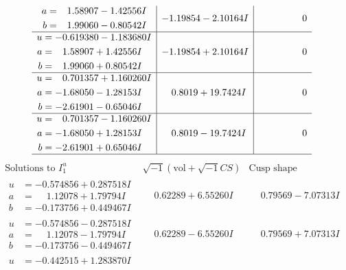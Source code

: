 \documentclass[1p]{elsarticle_modified}
\theoremstyle{definition}
\newcommand{\I}{\sqrt{-1}}
\begin{document}
$$\begin{array}{c|c|c}
\begin{aligned}
a &= \phantom{-}1.58907 - 1.42556 I \\
b &= \phantom{-}1.99060 - 0.80542 I\end{aligned}
 & -1.19854 - 2.10164 I & \phantom{-0.000000 } 0 \\ \hline\begin{aligned}
u &= -0.619380 - 1.183680 I \\
a &= \phantom{-}1.58907 + 1.42556 I \\
b &= \phantom{-}1.99060 + 0.80542 I\end{aligned}
 & -1.19854 + 2.10164 I & \phantom{-0.000000 } 0 \\ \hline\begin{aligned}
u &= \phantom{-}0.701357 + 1.160260 I \\
a &= -1.68050 - 1.28153 I \\
b &= -2.61901 - 0.65046 I\end{aligned}
 & \phantom{-}0.8019 + 19.7424 I & \phantom{-0.000000 } 0 \\ \hline\begin{aligned}
u &= \phantom{-}0.701357 - 1.160260 I \\
a &= -1.68050 + 1.28153 I \\
b &= -2.61901 + 0.65046 I\end{aligned}
 & \phantom{-}0.8019 - 19.7424 I & \phantom{-0.000000 } 0\\
 \hline 
 \end{array}$$\newpage$$\begin{array}{c|c|c}  
\text{Solutions to }I^u_{1}& \I (\text{vol} + \sqrt{-1}CS) & \text{Cusp shape}\\
 \hline 
\begin{aligned}
u &= -0.574856 + 0.287518 I \\
a &= \phantom{-}1.12078 + 1.79794 I \\
b &= -0.173756 + 0.449467 I\end{aligned}
 & \phantom{-}0.62289 + 6.55260 I & \phantom{-}0.79569 - 7.07313 I \\ \hline\begin{aligned}
u &= -0.574856 - 0.287518 I \\
a &= \phantom{-}1.12078 - 1.79794 I \\
b &= -0.173756 - 0.449467 I\end{aligned}
 & \phantom{-}0.62289 - 6.55260 I & \phantom{-}0.79569 + 7.07313 I \\ \hline\begin{aligned}
u &= -0.442515 + 1.283870 I \\

\end{aligned}
\end{array}$$
\end{document}
